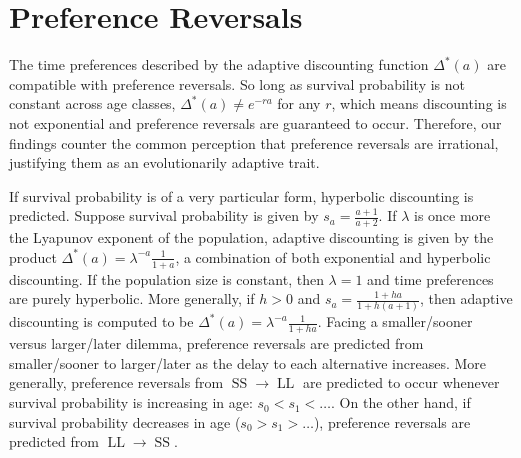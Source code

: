 \documentclass[titlepage, hidelinks, 12pt]{article}
\theoremstyle{plain}
\theoremstyle{remark}
\theoremstyle{definition}
\DeclareMathOperator{\smallersooner}{SS}
\DeclareMathOperator{\largerlater}{LL}
\begin{document}

\section{Preference Reversals}
The time preferences described by the adaptive discounting function $\Delta^*(a)$ are compatible with preference reversals. 
So long as survival probability is not constant across age classes, $\Delta^*(a) \ne e^{-ra}$ for any $r$, which means discounting
is not exponential and preference reversals are guaranteed to occur. Therefore, our findings counter the common perception that preference
reversals are irrational, justifying them as an evolutionarily adaptive trait. 

If survival probability is of a very particular form, hyperbolic discounting is predicted. 
Suppose survival probability is given by $s_a = \frac{a+1}{a+2}$. If $\lambda$ is once more the Lyapunov exponent of the population, adaptive
discounting is given by the product $\Delta^*(a) = \lambda^{-a}\frac{1}{1+a}$, a combination of both exponential and hyperbolic discounting. 
If the population size is constant, then $\lambda = 1$ and time preferences are purely hyperbolic. More generally, if 
$h>0$ and $s_a = \frac{1+ha}{1 + h(a+1)}$, then adaptive discounting
is computed to be $\Delta^*(a) = \lambda^{-a}\frac{1}{1+ha}$. Facing a smaller/sooner versus larger/later dilemma, preference reversals are
predicted from smaller/sooner to larger/later as the delay to each alternative increases. 
More generally, preference reversals from $\smallersooner\to\largerlater$ are predicted to occur whenever survival probability is increasing in age:
$s_0 < s_1 < \ldots$.  On the other hand, if survival probability decreases in age ($s_0 > s_1 > \ldots$), preference reversals are 
predicted from $\largerlater\to\smallersooner$. 
\end{document}
